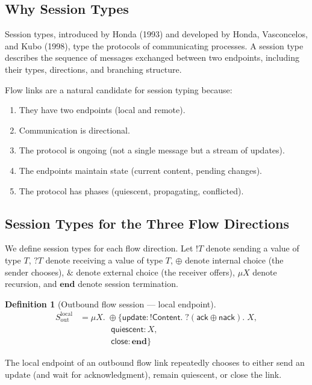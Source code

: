\documentclass[11pt]{article}
\newtheorem{definition}{Definition}
\newcommand{\sess}[1]{\mathsf{#1}}
\newcommand{\tp}[1]{\mathsf{#1}}
\newcommand{\kw}[1]{\mathbf{#1}}
\begin{document}
\subsection{Why Session Types}

Session types, introduced by Honda (1993) and developed by Honda, Vasconcelos,
and Kubo (1998), type the protocols of communicating processes. A session type
describes the sequence of messages exchanged between two endpoints, including
their types, directions, and branching structure.

Flow links are a natural candidate for session typing because:
\begin{enumerate}
  \item They have two endpoints (local and remote).
  \item Communication is directional.
  \item The protocol is ongoing (not a single message but a stream of updates).
  \item The endpoints maintain state (current content, pending changes).
  \item The protocol has phases (quiescent, propagating, conflicted).
\end{enumerate}

\subsection{Session Types for the Three Flow Directions}

We define session types for each flow direction. Let $!T$ denote sending a
value of type $T$, $?T$ denote receiving a value of type $T$, $\oplus$ denote
internal choice (the sender chooses), $\&$ denote external choice (the receiver
offers), $\mu X$ denote recursion, and $\kw{end}$ denote session termination.

\begin{definition}[Outbound flow session --- local endpoint]
\begin{align*}
  S_{\text{out}}^{\text{local}} &= \mu X.\; \oplus \{
    \sess{update}: !\tp{Content}.\; ?(\sess{ack} \oplus \sess{nack}).\; X, \\
    &\qquad\quad\;\;\,
    \sess{quiescent}: X, \\
    &\qquad\quad\;\;\,
    \sess{close}: \kw{end}
  \}
\end{align*}
\end{definition}

The local endpoint of an outbound flow link repeatedly chooses to either send an
update (and wait for acknowledgment), remain quiescent, or close the link.
\end{document}
